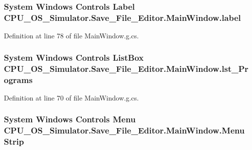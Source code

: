 \subsubsection[{label}]{\setlength{\rightskip}{0pt plus 5cm}System Windows Controls Label C\+P\+U\+\_\+\+O\+S\+\_\+\+Simulator.\+Save\+\_\+\+File\+\_\+\+Editor.\+Main\+Window.\+label\hspace{0.3cm}{\ttfamily [package]}}\label{class_c_p_u___o_s___simulator_1_1_save___file___editor_1_1_main_window_ac0c64a25031b8c702364d92553ae98a7}


Definition at line 78 of file Main\+Window.\+g.\+cs.

\hypertarget{class_c_p_u___o_s___simulator_1_1_save___file___editor_1_1_main_window_af63f60251391d783dcb3cab281076e38}{}
\subsubsection[{lst\+\_\+\+Programs}]{\setlength{\rightskip}{0pt plus 5cm}System Windows Controls List\+Box C\+P\+U\+\_\+\+O\+S\+\_\+\+Simulator.\+Save\+\_\+\+File\+\_\+\+Editor.\+Main\+Window.\+lst\+\_\+\+Programs\hspace{0.3cm}{\ttfamily [package]}}\label{class_c_p_u___o_s___simulator_1_1_save___file___editor_1_1_main_window_af63f60251391d783dcb3cab281076e38}


Definition at line 70 of file Main\+Window.\+g.\+cs.

\hypertarget{class_c_p_u___o_s___simulator_1_1_save___file___editor_1_1_main_window_ad7217e9c5af484ec701b1f9ffdedb38d}{}
\subsubsection[{Menu\+Strip}]{\setlength{\rightskip}{0pt plus 5cm}System Windows Controls Menu C\+P\+U\+\_\+\+O\+S\+\_\+\+Simulator.\+Save\+\_\+\+File\+\_\+\+Editor.\+Main\+Window.\+Menu\+Strip\hspace{0.3cm}{\ttfamily [package]}}\label{class_c_p_u___o_s___simulator_1_1_save___file___editor_1_1_main_window_ad7217e9c5af484ec701b1f9ffdedb38d}


